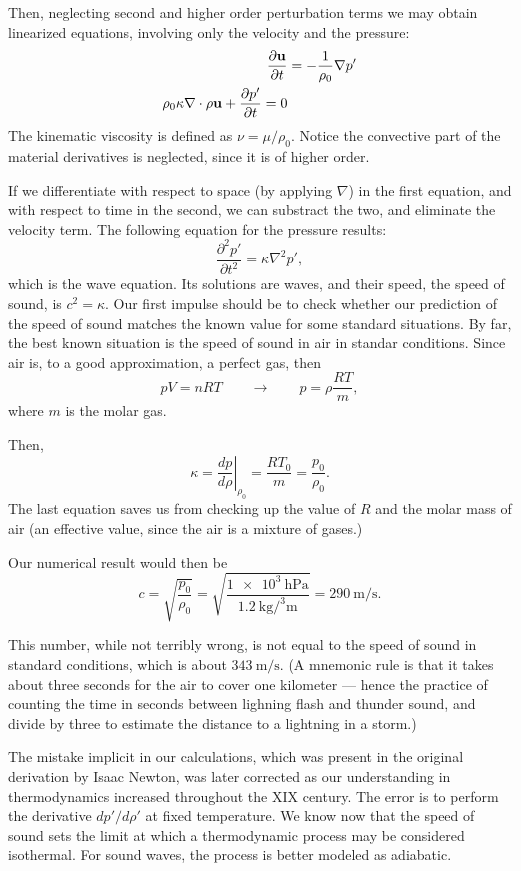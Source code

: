Then, neglecting second and higher order perturbation terms we may
obtain linearized equations, involving only the velocity and the
pressure:
\begin{align}
  \label{eq:sound_lin_cont}
  \frac{\partial \mathbf{u} }{\partial t} & = - \frac{1}{\rho_0} \nabla p' \\
  \rho_0 \kappa \nabla \cdot \mathbf{\rho u} +
  \frac{\partial p'}{\partial t} =0 
\end{align}
The kinematic viscosity is defined as $ \nu=\mu/\rho_0$.%
Notice the convective part of the material derivatives is neglected,
since it is of higher order.

If we differentiate with respect to space (by applying $ \nabla$) in
the first equation, and with respect to time in the second, we can
substract the two, and eliminate the velocity term. 
The following equation for the pressure results:
\[
\frac{\partial^2 p' }{\partial t^2 }  = \kappa \nabla^2 p' ,
\]
which is the wave equation. Its solutions are waves, and their speed,
the speed of sound, is $c^2 = \kappa $. Our first impulse should be to
check whether our prediction of the speed of sound matches the known
value for some standard situations. By far, the best known situation
is the speed of sound in air in standar conditions. Since air is, to
a good approximation, a perfect gas, then
\[
p V = n R T \qquad\to\qquad p  = \rho\frac{ R T}{m},
\]
where $m$ is the molar gas.

Then,
\[
\kappa =  \left. \frac{d p}{d\rho} \right|_{\rho_0} =
 \frac{ R T_0}{m} = \frac{ p_0 }{ \rho_0 } .
\]
The last equation saves us from checking up the value of $R$ and the
molar mass of air (an effective value, since the air is a mixture of
gases.)

Our numerical result would then be
\[
c= \sqrt{\frac{ p_0 }{ \rho_0 }} =
\sqrt{\frac%
  { \SI{1e3}{\hecto\pascal} }%
  {\SI{1.2}{\kilo\gram\per\cubed\meter}}} =
\SI{290}{\meter\per\second} .
\]

This number, while not terribly wrong, is not equal to the speed of
sound in standard conditions, which is about
$\SI{343}{\meter\per\second}$. (A mnemonic rule is that it takes about
three seconds for the air to cover one kilometer --- hence the
practice of counting the time in seconds between lighning flash and
thunder sound, and divide by three to estimate the distance to a
lightning in a storm.)

The mistake implicit in our calculations, which was present in the
original derivation by Isaac Newton, was later corrected as our
understanding in thermodynamics increased throughout the XIX
century. The error is to perform the derivative $d p' / d\rho'$ at
fixed temperature. We know now that the speed of sound sets the limit
at which a thermodynamic process may be considered isothermal. For
sound waves, the process is better modeled as
adiabatic.

